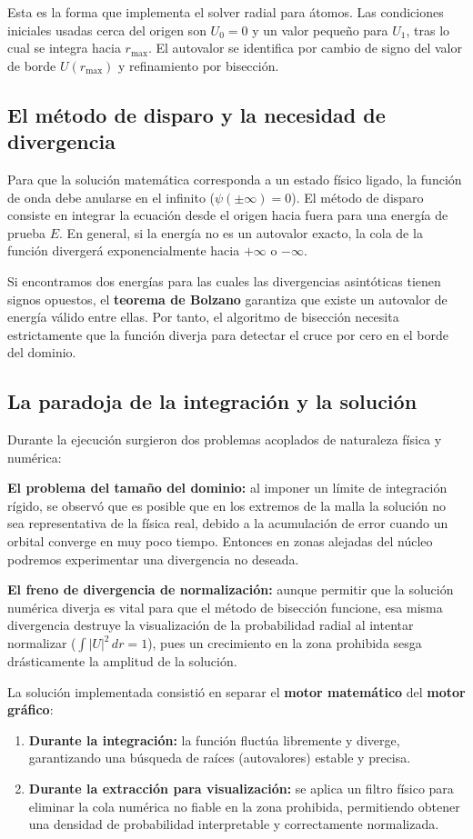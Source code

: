 \documentclass[11pt]{article}
\begin{document}
Esta es la forma que implementa el solver radial para átomos. Las condiciones iniciales usadas cerca del origen son \(U_0=0\) y un valor pequeño para \(U_1\), tras lo cual se integra hacia \(r_{\max}\). El autovalor se identifica por cambio de signo del valor de borde \(U(r_{\max})\) y refinamiento por bisección.

\subsection{El método de disparo y la necesidad de divergencia}
Para que la solución matemática corresponda a un estado físico ligado, la función de onda debe anularse en el infinito ($\psi(\pm \infty) = 0$). El método de disparo consiste en integrar la ecuación desde el origen hacia fuera para una energía de prueba $E$. En general, si la energía no es un autovalor exacto, la cola de la función divergerá exponencialmente hacia $+\infty$ o $-\infty$.

Si encontramos dos energías para las cuales las divergencias asintóticas tienen signos opuestos, el \textbf{teorema de Bolzano} garantiza que existe un autovalor de energía válido entre ellas. Por tanto, el algoritmo de bisección necesita estrictamente que la función diverja para detectar el cruce por cero en el borde del dominio.

\subsection{La paradoja de la integración y la solución}
Durante la ejecución surgieron dos problemas acoplados de naturaleza física y numérica:

\textbf{El problema del tamaño del dominio:} al imponer un límite de integración rígido, se observó que es posible que en los extremos de la malla la solución no sea representativa de la física real, debido a la acumulación de error cuando un orbital converge en muy poco tiempo. Entonces en zonas alejadas del núcleo podremos experimentar una divergencia no deseada.

\textbf{El freno de divergencia de normalización:} aunque permitir que la solución numérica diverja es vital para que el método de bisección funcione, esa misma divergencia destruye la visualización de la probabilidad radial al intentar normalizar ($\int |U|^2 \, dr = 1$), pues un crecimiento en la zona prohibida sesga drásticamente la amplitud de la solución.

La solución implementada consistió en separar el \textbf{motor matemático} del \textbf{motor gráfico}:
\begin{enumerate}
    \item \textbf{Durante la integración:} la función fluctúa libremente y diverge, garantizando una búsqueda de raíces (autovalores) estable y precisa.
    \item \textbf{Durante la extracción para visualización:} se aplica un filtro físico para eliminar la cola numérica no fiable en la zona prohibida, permitiendo obtener una densidad de probabilidad interpretable y correctamente normalizada.
\end{enumerate}
\end{document}
